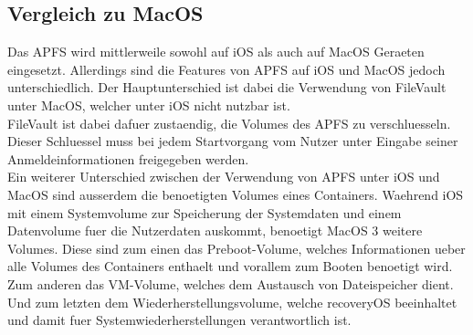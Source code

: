 \subsection{Vergleich zu MacOS}
Das APFS wird mittlerweile sowohl auf iOS als auch auf MacOS Geraeten eingesetzt. Allerdings sind die Features von APFS auf iOS und MacOS jedoch unterschiedlich. Der Hauptunterschied ist dabei die Verwendung von FileVault unter MacOS, welcher unter iOS nicht nutzbar ist.\\
FileVault ist dabei dafuer zustaendig, die Volumes des APFS zu verschluesseln. Dieser Schluessel muss bei jedem Startvorgang vom Nutzer unter Eingabe seiner Anmeldeinformationen freigegeben werden.\\
Ein weiterer Unterschied zwischen der Verwendung von APFS unter iOS und MacOS sind ausserdem die benoetigten Volumes eines Containers.
Waehrend iOS mit einem Systemvolume zur Speicherung der Systemdaten und einem Datenvolume fuer die Nutzerdaten auskommt, benoetigt MacOS 3 weitere Volumes. Diese sind zum einen das Preboot-Volume, welches Informationen ueber alle Volumes des Containers enthaelt und vorallem zum Booten benoetigt wird. Zum anderen das VM-Volume, welches dem Austausch von Dateispeicher dient. Und zum letzten dem Wiederherstellungsvolume, welche recoveryOS beeinhaltet und damit fuer Systemwiederherstellungen verantwortlich ist.
